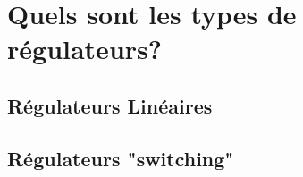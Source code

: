 
\section{Quels sont les types de régulateurs?}

\subsection{Régulateurs Linéaires}
\subsection{Régulateurs "switching"}